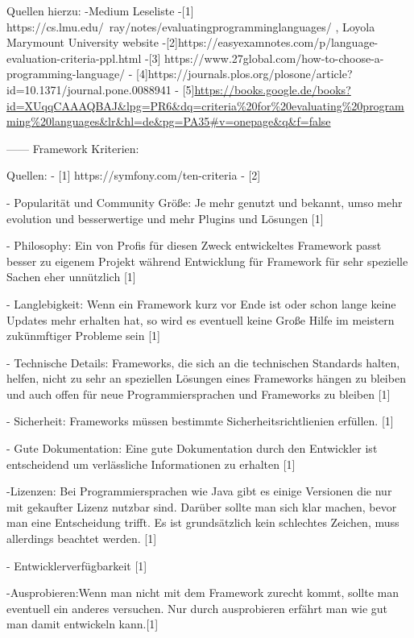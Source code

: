 Quellen hierzu:
-Medium Leseliste
-[1] https://cs.lmu.edu/~ray/notes/evaluatingprogramminglanguages/  , Loyola Marymount University website
-[2]https://easyexamnotes.com/p/language-evaluation-criteria-ppl.html
-[3] https://www.27global.com/how-to-choose-a-programming-language/
- [4]https://journals.plos.org/plosone/article?id=10.1371/journal.pone.0088941
- [5]\url{https://books.google.de/books?id=XUqqCAAAQBAJ&lpg=PR6&dq=criteria%20for%20evaluating%20programming%20languages&lr&hl=de&pg=PA35#v=onepage&q&f=false}

------
Framework Kriterien:

Quellen:
- [1] https://symfony.com/ten-criteria
- [2]


- Popularität und Community Größe: Je mehr genutzt und bekannt, umso mehr evolution und besserwertige und mehr Plugins und Lösungen [1]

- Philosophy: Ein von Profis für diesen Zweck entwickeltes Framework passt besser zu eigenem Projekt während Entwicklung für Framework für sehr spezielle Sachen eher unnützlich [1]

- Langlebigkeit: Wenn ein Framework kurz vor Ende ist oder schon lange keine Updates mehr erhalten hat, so wird es eventuell keine Große Hilfe im meistern zukünmftiger Probleme sein [1]

- Technische Details: Frameworks, die sich an die technischen Standards halten, helfen, nicht zu sehr an speziellen Lösungen eines Frameworks hängen zu bleiben und auch offen für neue Programmiersprachen und Frameworks zu bleiben [1]

- Sicherheit: Frameworks müssen bestimmte Sicherheitsrichtlienien erfüllen. [1]

- Gute Dokumentation: Eine gute Dokumentation durch den Entwickler ist entscheidend um verlässliche Informationen zu erhalten [1]

-Lizenzen: Bei Programmiersprachen wie Java gibt es einige Versionen die nur mit gekaufter Lizenz nutzbar sind. Darüber sollte man sich klar machen, bevor man eine Entscheidung trifft. Es ist grundsätzlich kein schlechtes Zeichen, muss allerdings beachtet werden. [1]

- Entwicklerverfügbarkeit [1]

-Ausprobieren:Wenn man nicht mit dem Framework zurecht kommt, sollte man eventuell ein anderes versuchen. Nur durch ausprobieren erfährt man wie gut man damit entwickeln kann.[1]
